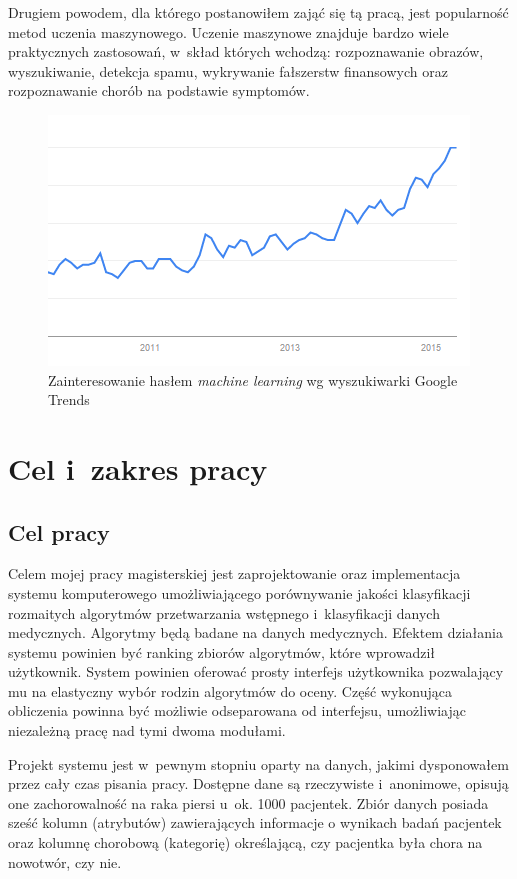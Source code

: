 \documentclass[../thesis.tex]{subfiles}
\begin{document}
Drugiem powodem, dla którego postanowiłem zająć się tą pracą, jest popularność metod uczenia maszynowego. Uczenie maszynowe znajduje bardzo wiele praktycznych zastosowań, w~skład których wchodzą: rozpoznawanie obrazów, wyszukiwanie, detekcja spamu, wykrywanie fałszerstw finansowych oraz rozpoznawanie chorób na podstawie symptomów. 

\begin{figure}[h]
\centering
\includegraphics{ml_chart.png}
\caption{Zainteresowanie hasłem \textit{machine learning} wg wyszukiwarki Google Trends}
\label{intro:ml_chart}
\end{figure}

\section{Cel i~zakres pracy}

\subsection{Cel pracy}

Celem mojej pracy magisterskiej jest zaprojektowanie oraz implementacja systemu komputerowego umożliwiającego porównywanie jakości klasyfikacji rozmaitych algorytmów przetwarzania wstępnego i~klasyfikacji danych medycznych. Algorytmy będą badane na danych medycznych. Efektem działania systemu powinien być ranking zbiorów algorytmów, które wprowadził użytkownik. System powinien oferować prosty interfejs użytkownika pozwalający mu na elastyczny wybór rodzin algorytmów do oceny. Część wykonująca obliczenia powinna być możliwie odseparowana od interfejsu, umożliwiając niezależną pracę nad tymi dwoma modułami.

Projekt systemu jest w~pewnym stopniu oparty na danych, jakimi dysponowałem przez cały czas pisania pracy. Dostępne dane są rzeczywiste i~anonimowe, opisują one zachorowalność na raka piersi u~ok. 1000 pacjentek. Zbiór danych posiada sześć kolumn (atrybutów) zawierających informacje o wynikach badań pacjentek oraz kolumnę chorobową (kategorię) określającą, czy pacjentka była chora na nowotwór, czy nie.
\end{document}
